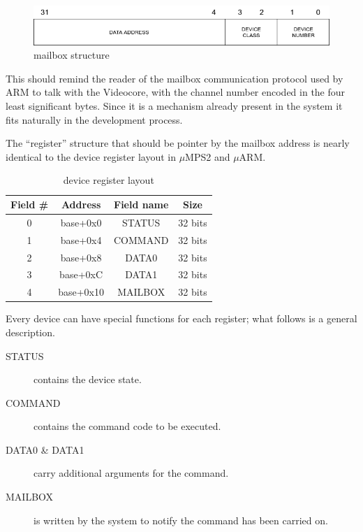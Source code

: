 \documentclass[12pt,a4paper,openright,twoside]{report}
\begin{document}
\begin{figure}[h]
\includegraphics[scale=0.571]{images/tesi5.png}
\caption[Figure 5]{mailbox structure}\label{fig:mailbox}
\end{figure}

This should remind the reader of the mailbox communication protocol used by ARM
to talk with the Videocore, with the channel number encoded in the four least significant
bytes. Since it is a mechanism already present in the system it fits naturally
in the development process.

The ``register'' structure that should be pointer by the mailbox address is nearly 
identical to the device register layout in $\mu$MPS2 and $\mu$ARM.

\begin{table}[h]
\begin{center}
    \begin{tabular}{|c|c|c|c|}
    \hline
    \rowcolor[HTML]{C0C0C0} 
    Field \# & Address   & Field name & Size    \\ \hline
    0        & base+0x0  & STATUS     & 32 bits \\ \hline
    1        & base+0x4  & COMMAND    & 32 bits \\ \hline
    2        & base+0x8  & DATA0      & 32 bits \\ \hline
    3        & base+0xC  & DATA1      & 32 bits \\ \hline
    4        & base+0x10 & MAILBOX    & 32 bits \\ \hline
    \end{tabular}
 \caption[Table 1]{device register layout}\label{tab:reg}
\end{center}
\end{table}

Every device can have special functions for each register; what follows is a
general description.
\begin{description}
    \item[STATUS] contains the device state.
    \item[COMMAND] contains the command code to be executed.
    \item[DATA0 \& DATA1] carry additional arguments for the command.
    \item[MAILBOX] is written by the system to notify the command has been carried on.
\end{description}
\end{document}
